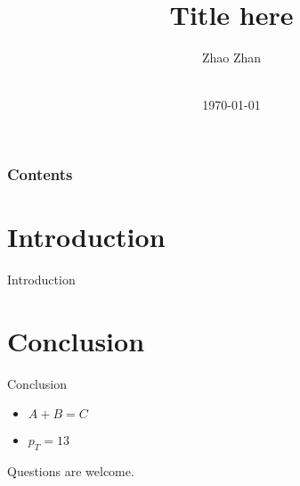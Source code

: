 \documentclass[aspectratio=43]{beamer}
\title[\meetingname]{Title here}
\author[Z Zhan]{Zhao Zhan}
\institute[HUST]{Huazhong University of Science and Technology}
\date[\mydate]{\meetingname\\\today}
\begin{document}
\begin{frame}[plain,t]
\titlepage
\end{frame}

\begin{frame}
\frametitle{Contents}
\tableofcontents
\end{frame}
\section{Introduction}
    \begin{frame}{Introduction}
    \end{frame}


\section{Conclusion}

    \begin{frame}{Conclusion}
    
    \begin{itemize}
        \item $A+B=C$
        \item $p_T=13$
    \end{itemize}
    \end{frame}

\begin{frame}
\centering
\Huge
Questions are welcome.
\end{frame}
\end{document}
